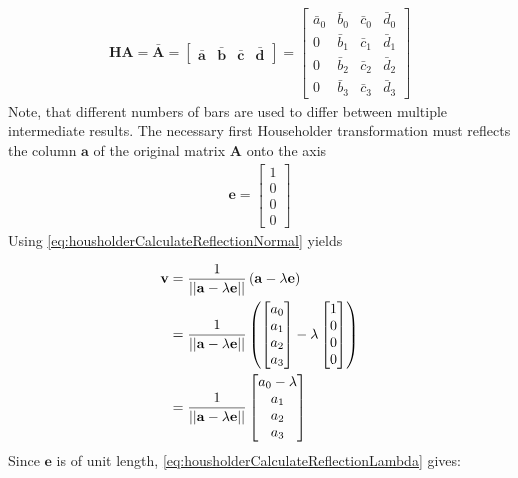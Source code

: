 \begin{align}
\mathbf{H}\mathbf{A} 
=
\mathbf{\bar{A}}
=
\begin{bmatrix}
\mathbf{\bar{a}} & \mathbf{\bar{b}} & \mathbf{\bar{c}} & \mathbf{\bar{d}}
\end{bmatrix}
=
\begin{bmatrix}
\bar{a}_0&\bar{b}_0&\bar{c}_0&\bar{d}_0\\
0        &\bar{b}_1&\bar{c}_1&\bar{d}_1\\
0        &\bar{b}_2&\bar{c}_2&\bar{d}_2\\
0        &\bar{b}_3&\bar{c}_3&\bar{d}_3
\end{bmatrix}					  
\end{align}
%
Note, that different numbers of bars are used to differ between multiple intermediate results.
The necessary first Householder transformation must reflects the column $\mathbf{a}$ of the original matrix $\mathbf{A}$ onto the axis
\begin{align}
\mathbf{e}  
=
\begin{bmatrix}
1\\
0\\
0\\
0
\end{bmatrix}
\end{align}
%
Using \cref{eq:housholderCalculateReflectionNormal} yields

\begin{align}
\mathbf{v} 
&= 
\frac{1}{\left\vert\left\vert\mathbf{a} - \lambda \mathbf{e}\right\vert\right\vert}\left(\mathbf{a} - \lambda \mathbf{e}\right)\\
&=
\frac{1}{\left\vert\left\vert\mathbf{a} - \lambda \mathbf{e}\right\vert\right\vert}
\left(
\begin{bmatrix}
a_0\\
a_1\\
a_2\\
a_3
\end{bmatrix}
-	
\lambda	
\begin{bmatrix}
1\\
0\\
0\\
0
\end{bmatrix}
\right)\\
\label{eq:qrReflectionVector0StillContainingLambda}
&=
\frac{1}{\left\vert\left\vert\mathbf{a} - \lambda \mathbf{e}\right\vert\right\vert}
\begin{bmatrix}
a_0 - \lambda\\
a_1\\
a_2\\
a_3
\end{bmatrix}
\end{align}
%
Since $\mathbf{e}$ is of unit length, \cref{eq:housholderCalculateReflectionLambda} gives:

